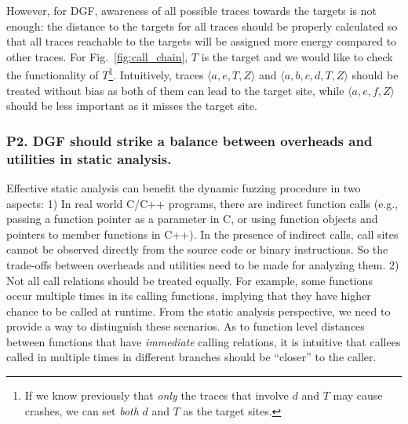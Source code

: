 However, for DGF, awareness of all possible traces towards the targets is not enough: the distance to the targets for all traces should be properly calculated so that all traces reachable to the targets will be assigned more energy compared to other traces. For Fig.~\ref{fig:call_chain}, $T$ is the target and we would like to check the functionality of $T$\footnote{If we know previously that \emph{only} the traces that involve $d$ and $T$ may cause crashes, we can set \emph{both} $d$ and $T$ as the target sites.}. Intuitively, traces $ \langle a, e, T, Z\rangle$ and $\langle a, b, c, d, T, Z\rangle$ should be treated without bias as both of them can lead to the target site, while $ \langle a, e, f , Z\rangle$ should be less important as it misses the target site. 



\subsubsection{\textbf{P2}. DGF should strike a \textbf{balance} between overheads and utilities in static analysis.}\label{subsec:p2}  Effective static analysis can benefit the dynamic fuzzing procedure in two aspects: 1) In real world C/C++ programs, there are indirect function calls (e.g., passing a function pointer as a parameter in C, or using function objects and pointers to member functions in C++). In the presence of indirect calls, call sites cannot be observed directly from the source code or binary instructions. So the trade-offs between overheads and utilities need to be made for analyzing them. 2) Not all call relations should be treated equally. For example, some functions occur multiple times in its calling functions, implying  that they have higher chance to be called at runtime. From the static analysis perspective, we need to provide a way to distinguish these scenarios. As to function level distances between functions that have \emph{immediate} calling relations, it is intuitive that callees called in multiple times in different branches should be ``closer'' to the caller.


